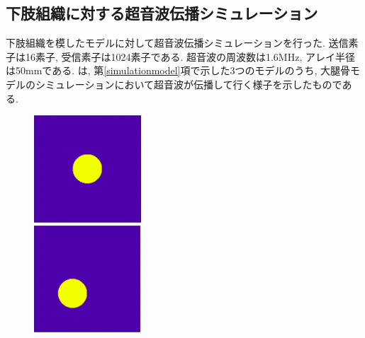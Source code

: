 \subsection{下肢組織に対する超音波伝播シミュレーション}
下肢組織を模したモデルに対して超音波伝播シミュレーションを行った. 送信素子は16素子, 受信素子は1024素子である. 超音波の周波数は1.6MHz, アレイ半径は50mmである. は, 第\ref{simulationmodel}項で示した3つのモデルのうち, 大腿骨モデルのシミュレーションにおいて超音波が伝播して行く様子を示したものである. 
\begin{figure}[H]
 \begin{minipage}{0.5\hsize}
  \begin{center}
   \includegraphics[width=40mm]{fig/daitai.pdf}
  \end{center}
 \end{minipage}
 \begin{minipage}{0.5\hsize}
 \begin{center}
  \includegraphics[width=40mm]{fig/keikotsu.pdf}
 \end{center}
 \end{minipage}
 \end{figure}
